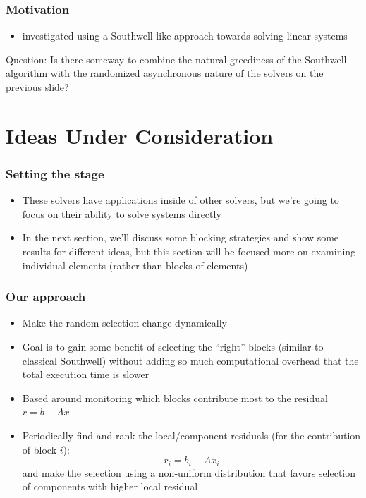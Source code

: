 \documentclass{beamer}
\begin{document}
\begin{frame}
	\frametitle{Motivation}
	\begin{itemize}
		\item \textcite{wolfson2017distributed} investigated using a Southwell-like approach towards solving linear systems
	\end{itemize}	
	\begin{block}{Question:}
	    Is there someway to combine the natural greediness of the Southwell algorithm with the randomized asynchronous nature of the solvers on the previous slide?
	\end{block}
\end{frame}


\section{Ideas Under Consideration}

\begin{frame}
	\frametitle{Setting the stage}
	\begin{itemize}
		\item These solvers have applications inside of other solvers, but we're going to focus on their ability to solve systems directly
		\item In the next section, we'll discuss some blocking strategies and show some results for different ideas, but this section will be focused more on examining individual elements (rather than blocks of elements)
	\end{itemize}
\end{frame}

\begin{frame}
	\frametitle{Our approach}
	\begin{itemize}
		\item Make the random selection change dynamically 
		\item Goal is to gain some benefit of selecting the ``right'' blocks (similar to classical Southwell) without adding so much computational overhead that the total execution time is slower
		\item Based around monitoring which blocks contribute most to the residual $r = b - Ax$
		\item Periodically find and rank the local/component residuals (for the contribution of block $i$):
			\begin{equation}
				r_i = b_i - Ax_i
			\end{equation}
			and make the selection using a non-uniform distribution that favors selection of components with higher local residual
	\end{itemize}
\end{frame}
\end{document}
